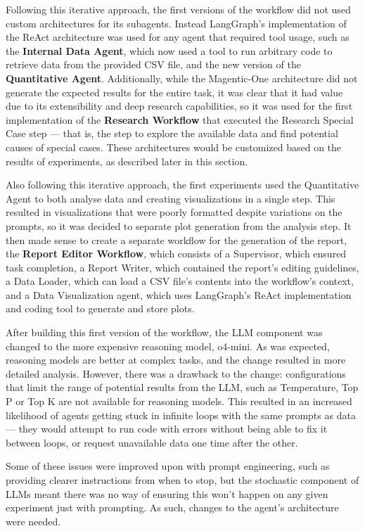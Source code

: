 \documentclass[a4paper]{report}
\begin{document}
Following this iterative approach, the first versions of the workflow did not used custom architectures for its subagents. Instead LangGraph's implementation of the ReAct architecture was used for any agent that required tool usage, such as the \textbf{Internal Data Agent}, which now used a tool to run arbitrary code to retrieve data from the provided CSV file, and the new version of the \textbf{Quantitative Agent}. Additionally, while the Magentic-One architecture did not generate the expected results for the entire task, it was clear that it had value due to its extensibility and deep research capabilities, so it was used for the first implementation of the \textbf{Research Workflow} that executed the Research Special Case step --- that is, the step to explore the available data and find potential causes of special cases. These architectures would be customized based on the results of experiments, as described later in this section.

Also following this iterative approach, the first experiments used the Quantitative Agent to both analyse data and creating visualizations in a single step. This resulted in visualizations that were poorly formatted despite variations on the prompts, so it was decided to separate plot generation from the analysis step. It then made sense to create a separate workflow for the generation of the report, the \textbf{Report Editor Workflow}, which consists of a Supervisor, which ensured task completion, a Report Writer, which contained the report's editing guidelines, a Data Loader, which can load a CSV file's contents into the workflow's context, and a Data Visualization agent, which uses LangGraph's ReAct implementation and coding tool to generate and store plots.

After building this first version of the workflow, the LLM component was changed to the more expensive reasoning model, o4-mini. As was expected, reasoning models are better at complex tasks, and the change resulted in more detailed analysis. However, there was a drawback to the change: configurations that limit the range of potential results from the LLM, such as Temperature, Top P or Top K are not available for reasoning models. This resulted in an increased likelihood of agents getting stuck in infinite loops with the same prompts as data --- they would attempt to run code with errors without being able to fix it between loops, or request unavailable data one time after the other.

Some of these issues were improved upon with prompt engineering, such as providing clearer instructions from when to stop, but the stochastic component of LLMs meant there was no way of ensuring this won't happen on any given experiment just with prompting. As such, changes to the agent's architecture were needed.
\end{document}
